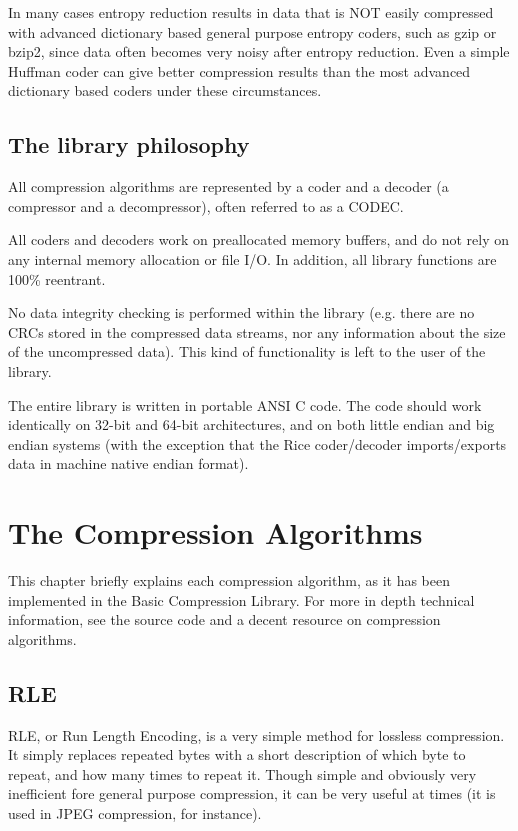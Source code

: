 \documentclass[a4paper,11pt,oneside]{report}
\begin{document}
In many cases entropy reduction results in data that is NOT easily
compressed with advanced dictionary based general purpose entropy coders,
such as gzip or bzip2, since data often becomes very noisy after entropy
reduction. Even a simple Huffman coder can give better compression
results than the most advanced dictionary based coders under these
circumstances.


\section{The library philosophy}
All compression algorithms are represented by a coder and a decoder (a
compressor and a decompressor), often referred to as a CODEC.

All coders and decoders work on preallocated memory buffers, and do not
rely on any internal memory allocation or file I/O. In addition, all
library functions are 100\% reentrant.

No data integrity checking is performed within the library (e.g. there are
no CRCs stored in the compressed data streams, nor any information about
the size of the uncompressed data). This kind of functionality is left to
the user of the library.

The entire library is written in portable ANSI C code. The code should
work identically on 32-bit and 64-bit architectures, and on both little
endian and big endian systems (with the exception that the Rice
coder/decoder imports/exports data in machine native endian format).


\chapter{The Compression Algorithms}
\thispagestyle{fancy}
This chapter briefly explains each compression algorithm, as it has been
implemented in the Basic Compression Library. For more in depth technical
information, see the source code and a decent resource on compression
algorithms.

\section{RLE}
RLE, or Run Length Encoding, is a very simple method for lossless
compression. It simply replaces repeated bytes with a short description
of which byte to repeat, and how many times to repeat it. Though simple
and obviously very inefficient fore general purpose compression, it can be
very useful at times (it is used in JPEG compression, for instance).
\end{document}
